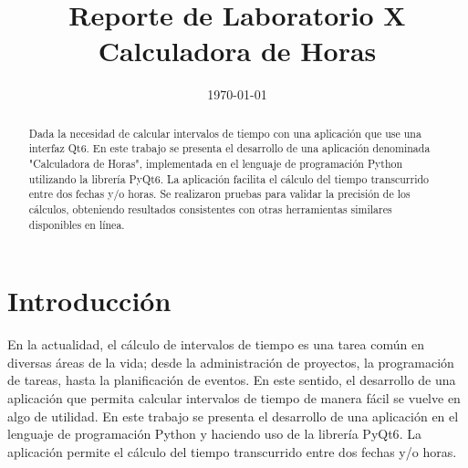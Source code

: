 \documentclass[conference]{IEEEtran}
\date{\specialdate\today}
\begin{document}
\newcommand{\breite}{0.9} %
\newcommand{\RelacionFiguradoscolumnas}{0.9}
\newcommand{\RelacionFiguradoscolumnasPuntoCinco}{0.45}

\title{Reporte de Laboratorio X \\ Calculadora de Horas}

\author{
}

\maketitle

\begin{abstract} 
    Dada la necesidad de calcular intervalos de tiempo con una aplicación que use una interfaz Qt6. En este trabajo se presenta el desarrollo de una aplicación denominada "Calculadora de Horas", implementada en el lenguaje de programación Python utilizando la librería PyQt6. La aplicación facilita el cálculo del tiempo transcurrido entre dos fechas y/o horas. Se realizaron pruebas para validar la precisión de los cálculos, obteniendo resultados consistentes con otras herramientas similares disponibles en línea\cite{calculator}.
\end{abstract}

\section{Introducción}
    En la actualidad, el cálculo de intervalos de tiempo es una tarea común en diversas áreas de la vida; desde la administración de proyectos, la programación de tareas, hasta la planificación de eventos. En este sentido, el desarrollo de una aplicación que permita calcular intervalos de tiempo de manera fácil se vuelve en algo de utilidad. En este trabajo se presenta el desarrollo de una aplicación en el lenguaje de programación Python\cite{python} y haciendo uso de la librería PyQt6\cite{qt6}. La aplicación permite el cálculo del tiempo transcurrido entre dos fechas y/o horas.
\end{document}
